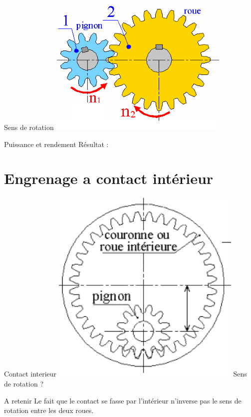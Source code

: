 \documentclass{beamer}
\begin{document}
\begin{frame}[t]{Sens de rotation}
  \includegraphics[width=.7\textwidth]{images/engrenage_2_droit}
\end{frame}
\begin{frame}[t]{Puissance et rendement}
  Résultat :
\end{frame}

\section{Engrenage a contact intérieur}
\begin{frame}[t]{Contact interieur}
  \includegraphics[width=.7\textwidth]{images/engre_interieur}
  Sens de rotation ?
\end{frame}

\begin{frame}[t]{A retenir}
  Le fait que le contact se fasse par l’intérieur n’inverse pas le sens de rotation entre les deux roues.
\end{frame}
\end{document}
